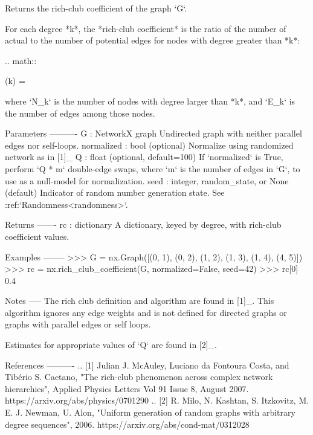 \begin{DoxyVerb}Returns the rich-club coefficient of the graph `G`.

For each degree *k*, the *rich-club coefficient* is the ratio of the
number of actual to the number of potential edges for nodes with
degree greater than *k*:

.. math::

    \phi(k) = 

where `N_k` is the number of nodes with degree larger than *k*, and
`E_k` is the number of edges among those nodes.

Parameters
----------
G : NetworkX graph
    Undirected graph with neither parallel edges nor self-loops.
normalized : bool (optional)
    Normalize using randomized network as in [1]_
Q : float (optional, default=100)
    If `normalized` is True, perform `Q * m` double-edge
    swaps, where `m` is the number of edges in `G`, to use as a
    null-model for normalization.
seed : integer, random_state, or None (default)
    Indicator of random number generation state.
    See :ref:`Randomness<randomness>`.

Returns
-------
rc : dictionary
   A dictionary, keyed by degree, with rich-club coefficient values.

Examples
--------
>>> G = nx.Graph([(0, 1), (0, 2), (1, 2), (1, 3), (1, 4), (4, 5)])
>>> rc = nx.rich_club_coefficient(G, normalized=False, seed=42)
>>> rc[0]
0.4

Notes
-----
The rich club definition and algorithm are found in [1]_.  This
algorithm ignores any edge weights and is not defined for directed
graphs or graphs with parallel edges or self loops.

Estimates for appropriate values of `Q` are found in [2]_.

References
----------
.. [1] Julian J. McAuley, Luciano da Fontoura Costa,
   and Tibério S. Caetano,
   "The rich-club phenomenon across complex network hierarchies",
   Applied Physics Letters Vol 91 Issue 8, August 2007.
   https://arxiv.org/abs/physics/0701290
.. [2] R. Milo, N. Kashtan, S. Itzkovitz, M. E. J. Newman, U. Alon,
   "Uniform generation of random graphs with arbitrary degree
   sequences", 2006. https://arxiv.org/abs/cond-mat/0312028
\end{DoxyVerb}
 